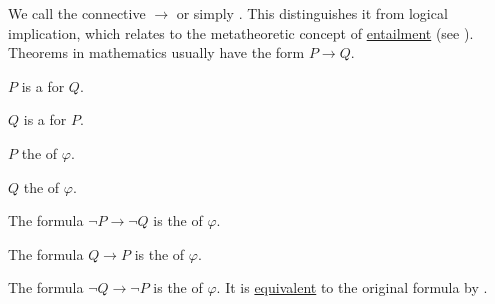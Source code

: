 \begin{definition}\label{def:material_implication}
  We call the connective \hyperref[def:propositional_language/connectives/implication]{\( \to \)}  or simply . This distinguishes it from logical implication, which relates to the metatheoretic concept of \hyperref[def:propositional_semantics/entailment]{entailment} (see \cite{MathSE:material_vs_logical_implication}). Theorems in mathematics usually have the form \( P \to Q \).

  \begin{defenum}
     \( P \) is a  for \( Q \).

     \( Q \) is a  for \( P \).

     \( P \) the  of \( \varphi \).

     \( Q \) the  of \( \varphi \).

     The formula \( \neg P \to \neg Q \) is the  of \( \varphi \).

     The formula \( Q \to P \) is the  of \( \varphi \).

     The formula \( \neg Q \to \neg P \) is the  of \( \varphi \). It is \hyperref[def:propositional_semantics/equivalence]{equivalent} to the original formula by .
  \end{defenum}
\end{definition}


